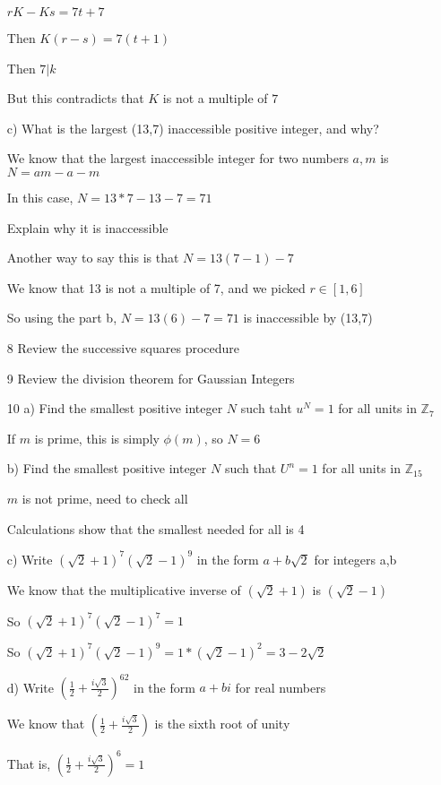 \documentclass[11pt]{article}
\begin{document}
\begin{itemize}
  $rK - Ks = 7t + 7$

  Then $K(r-s) = 7(t + 1)$

  Then $7|k$

  But this contradicts that $K$ is not a multiple of $7$

  c) What is the largest (13,7) inaccessible positive integer, and why?

  We know that the largest inaccessible integer for two numbers $a,m$ is $N = am - a - m$

  In this case, $N = 13*7 - 13 - 7 = 71$

  Explain why it is inaccessible

  Another way to say this is that $N = 13(7-1) - 7$

  We know that 13 is not a multiple of 7, and we picked $r \in [1,6]$

  So using the part b, $N = 13(6) - 7 =  71$ is inaccessible by (13,7)

\item[8] Review the successive squares procedure

\item[9]  Review the division theorem for Gaussian Integers

\item[10]
  a) Find the smallest positive integer $N$ such taht $u^N = 1$ for all units in $\mathbb{Z}_7$

  If $m$ is prime, this is simply $\phi(m)$, so $N = 6$

  b) Find the smallest positive integer $N$ such that $U^n = 1$ for all units in $\mathbb{Z}_{15}$

  $m$ is not prime, need to check all

  Calculations show that the smallest needed for all is 4

  c) Write $(\sqrt{2} + 1)^7 (\sqrt{2} - 1)^9$ in the form $a + b\sqrt{2}$ for integers a,b

  We know that the multiplicative inverse of $(\sqrt{2} + 1)$ is $(\sqrt{2} -1)$

  So $(\sqrt{2} + 1)^7(\sqrt{2} - 1)^7 = 1$

  So $(\sqrt{2} + 1)^7 (\sqrt{2} - 1)^9 = 1*(\sqrt{2} -1)^2 = 3 - 2\sqrt{2}$

  d) Write $(\frac{1}{2} + \frac{i\sqrt{3}}{2})^{62}$ in the form $a + bi$ for real numbers

  We know that $(\frac{1}{2} + \frac{i\sqrt{3}}{2})$ is the sixth root of unity

  That is, $(\frac{1}{2} + \frac{i\sqrt{3}}{2})^6 = 1$


\end{itemize}
\end{document}
